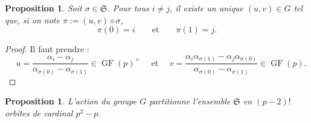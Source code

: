 \documentclass[a4paper, titlepage]{article}
\newtheorem{prop}[theo]{Proposition}
\theoremstyle{definition}
\theoremstyle{remark}
\def\gf{\operatorname{GF}}
\begin{document}
\begin{prop}
Soit $\sigma \in \mathfrak{S}$. Pour tous $i \neq j$, il existe un unique $(u,v) \in G$ tel que, si on note $\pi := (u,v) \diamond \sigma$, $$\pi(0) = i \qquad \text{et}\qquad \pi(1) = j.$$
\end{prop}

\begin{proof}
Il faut prendre :
$$\quad u = \frac{\alpha_i - \alpha_j}{\alpha_{\sigma(0)}- \alpha_{\sigma(1)}} \in \gf(p)^\times \quad \text{ et } \quad v =  \frac{\alpha_i\alpha_{\sigma(1)} - \alpha_j\alpha_{\sigma(0)}}{\alpha_{\sigma(0)}- \alpha_{\sigma(1)}} \in \gf(p).$$
\end{proof}

\begin{prop}
L'action du groupe $G$ partitionne l'ensemble $\mathfrak{S}$ en $(p-2)!$ orbites de cardinal $p^2-p$.
\end{prop}
\end{document}
